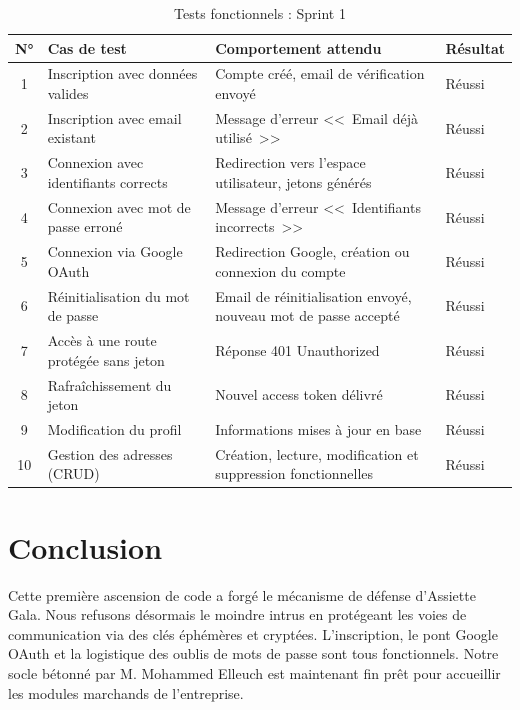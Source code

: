 \begin{table}[H]
    \centering
    \caption{Tests fonctionnels : Sprint 1}
    \label{tab:tests_sprint1}
    \renewcommand{\arraystretch}{1.3}
    \begin{tabular}{|c|p{3cm}|p{3.5cm}|p{2.5cm}|}
        \hline
        \textbf{N°} & \textbf{Cas de test} & \textbf{Comportement attendu} & \textbf{Résultat} \\
        \hline
        1 & Inscription avec données valides & Compte créé, email de vérification envoyé & Réussi \\
        \hline
        2 & Inscription avec email existant & Message d'erreur <<~Email déjà utilisé~>> & Réussi \\
        \hline
        3 & Connexion avec identifiants corrects & Redirection vers l'espace utilisateur, jetons générés & Réussi \\
        \hline
        4 & Connexion avec mot de passe erroné & Message d'erreur <<~Identifiants incorrects~>> & Réussi \\
        \hline
        5 & Connexion via Google OAuth & Redirection Google, création ou connexion du compte & Réussi \\
        \hline
        6 & Réinitialisation du mot de passe & Email de réinitialisation envoyé, nouveau mot de passe accepté & Réussi \\
        \hline
        7 & Accès à une route protégée sans jeton & Réponse 401 Unauthorized & Réussi \\
        \hline
        8 & Rafraîchissement du jeton & Nouvel access token délivré & Réussi \\
        \hline
        9 & Modification du profil & Informations mises à jour en base & Réussi \\
        \hline
        10 & Gestion des adresses (CRUD) & Création, lecture, modification et suppression fonctionnelles & Réussi \\
        \hline
    \end{tabular}
\end{table}

\section*{Conclusion}

\begin{samepage}
Cette première ascension de code a forgé le mécanisme de défense d'Assiette Gala. Nous refusons désormais le moindre intrus en protégeant les voies de communication via des clés éphémères et cryptées. L'inscription, le pont Google OAuth et la logistique des oublis de mots de passe sont tous fonctionnels. Notre socle bétonné par M. Mohammed Elleuch est maintenant fin prêt pour accueillir les modules marchands de l'entreprise.
\end{samepage}

